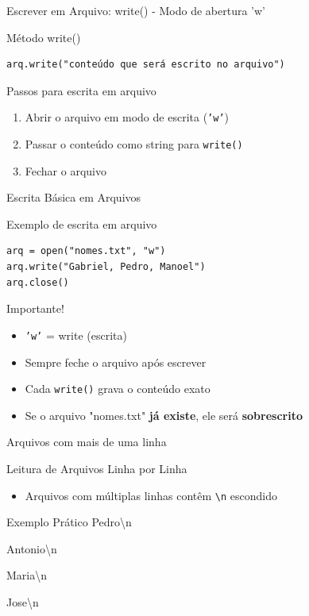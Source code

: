 \begin{frame}[fragile]{Escrever em Arquivo: write() - Modo de abertura 'w'}

\begin{block}{Método write()}
\begin{verbatim}
arq.write("conteúdo que será escrito no arquivo")
\end{verbatim}
\end{block}

\begin{block}{Passos para escrita em arquivo}
\begin{enumerate}
\item Abrir o arquivo em modo de escrita (\texttt{'w'})
\item Passar o conteúdo como string para \texttt{write()}
\item Fechar o arquivo
\end{enumerate}
\end{block}

\end{frame}

\begin{frame}[fragile]{Escrita Básica em Arquivos}
\begin{block}{Exemplo de escrita em arquivo}
\begin{verbatim}
arq = open("nomes.txt", "w")
arq.write("Gabriel, Pedro, Manoel")
arq.close()
\end{verbatim}
\end{block}

\begin{block}{Importante!}
\begin{itemize}
\item \texttt{'w'} = write (escrita)
\item Sempre feche o arquivo após escrever
\item Cada \texttt{write()} grava o conteúdo exato
\item Se o arquivo "nomes.txt" \textbf{já existe}, ele será \textbf{sobrescrito}
\end{itemize}
\end{block}
\end{frame}

\begin{frame}[fragile]{Arquivos com mais de uma linha}

\begin{block}{Leitura de Arquivos Linha por Linha}
\begin{itemize}
    \item Arquivos com múltiplas linhas contêm \texttt{\textbackslash n} escondido

\end{itemize}
\end{block}

\begin{exampleblock}{Exemplo Prático}
Pedro\textbackslash n

Antonio\textbackslash n

Maria\textbackslash n

Jose\textbackslash n
\end{exampleblock}

\end{frame}

